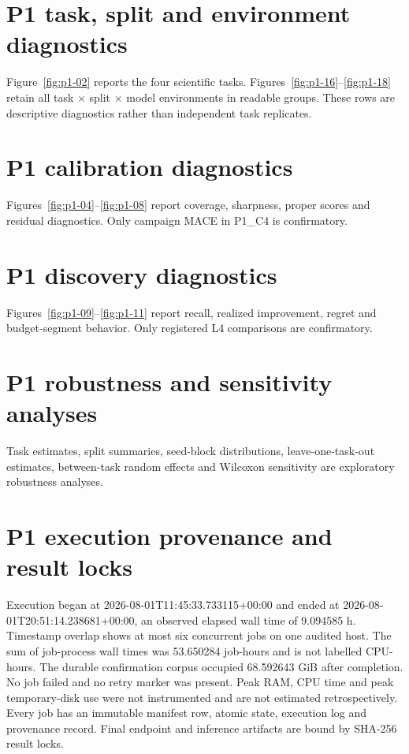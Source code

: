 \documentclass[10pt]{article}
\begin{document}
\section{P1 task, split and environment diagnostics}\label{sec:supp-p1-heterogeneity}
Figure~\ref{fig:p1-02} reports the four scientific tasks. Figures~\ref{fig:p1-16}--\ref{fig:p1-18} retain all task $\times$ split $\times$ model environments in readable groups. These rows are descriptive diagnostics rather than independent task replicates.

\section{P1 calibration diagnostics}\label{sec:supp-p1-calibration}
Figures~\ref{fig:p1-04}--\ref{fig:p1-08} report coverage, sharpness, proper scores and residual diagnostics. Only campaign MACE in P1\_C4 is confirmatory.

\section{P1 discovery diagnostics}\label{sec:supp-p1-discovery}
Figures~\ref{fig:p1-09}--\ref{fig:p1-11} report recall, realized improvement, regret and budget-segment behavior. Only registered L4 comparisons are confirmatory.

\section{P1 robustness and sensitivity analyses}\label{sec:supp-p1-robustness}
Task estimates, split summaries, seed-block distributions, leave-one-task-out estimates, between-task random effects and Wilcoxon sensitivity are exploratory robustness analyses.

\section{P1 execution provenance and result locks}\label{sec:supp-p1-provenance}
Execution began at 2026-08-01T11:45:33.733115+00:00 and ended at 2026-08-01T20:51:14.238681+00:00, an observed elapsed wall time of 9.094585 h. Timestamp overlap shows at most six concurrent jobs on one audited host. The sum of job-process wall times was 53.650284 job-hours and is not labelled CPU-hours. The durable confirmation corpus occupied 68.592643 GiB after completion. No job failed and no retry marker was present. Peak RAM, CPU time and peak temporary-disk use were not instrumented and are not estimated retrospectively. Every job has an immutable manifest row, atomic state, execution log and provenance record. Final endpoint and inference artifacts are bound by SHA-256 result locks.
\end{document}
